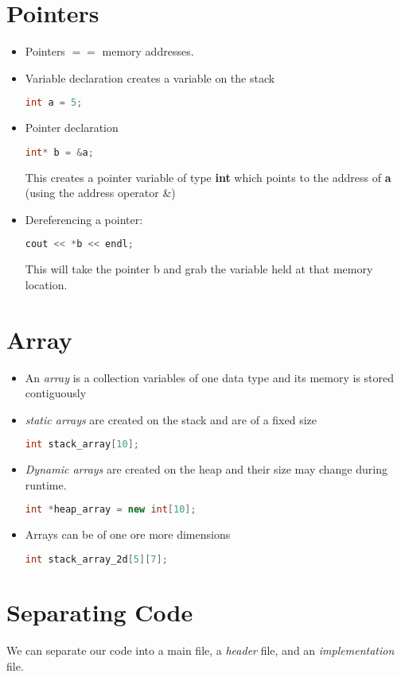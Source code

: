 \documentclass[a4paper, 11pt]{article}
\begin{document}
\section*{Pointers}
\begin{itemize}
\item Pointers $==$ memory addresses.
  
\item Variable declaration creates a variable on the stack

\begin{lstlisting}[language=C++]
int a = 5;
\end{lstlisting}
  
\item Pointer declaration
  
\begin{lstlisting}[language=C++]
int* b = &a; 
\end{lstlisting}
This creates a pointer variable of type \textbf{int} which points to the address
of \textbf{a} (using the address operator \&)

\item Dereferencing a pointer:
  
\begin{lstlisting}[language=C++]
cout << *b << endl; 
\end{lstlisting}
This will take the pointer b and grab the variable held at that memory location. 

\end{itemize}



\section*{Array}
\begin{itemize}
  \item An \textit{array} is a collection variables of one data type and its
    memory is stored contiguously

  \item \textit{static arrays} are created on the stack and are of a fixed size

\begin{lstlisting}[language=C++]
int stack_array[10]; 
\end{lstlisting}
    
  \item \textit{Dynamic arrays} are created on the heap and their size may
    change during runtime.

    
\begin{lstlisting}[language=C++]
int *heap_array = new int[10]; 
\end{lstlisting}

  \item Arrays can be of one ore more dimensions

    
\begin{lstlisting}[language=C++]
int stack_array_2d[5][7]; 
\end{lstlisting}
\end{itemize}


\section*{Separating Code}
We can separate our code into a main file, a \textit{header} file, and an
\textit{implementation} file.
\end{document}
